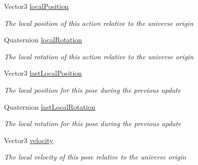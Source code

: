 \begin{DoxyCompactItemize}
Vector3 \mbox{\hyperlink{class_valve_1_1_v_r_1_1_steam_v_r___action___pose___source_adf0a89fb5f105a09f2e59151bd14e107}{local\+Position}}
\begin{DoxyCompactList}\small\item\em The local position of this action relative to the universe origin \end{DoxyCompactList}\item 
Quaternion \mbox{\hyperlink{class_valve_1_1_v_r_1_1_steam_v_r___action___pose___source_a2e2f84a6156ae78ba84497a3e4ef69ab}{local\+Rotation}}
\begin{DoxyCompactList}\small\item\em The local rotation of this action relative to the universe origin \end{DoxyCompactList}\item 
Vector3 \mbox{\hyperlink{class_valve_1_1_v_r_1_1_steam_v_r___action___pose___source_a30356d9d2fc9e4e03544406a493b36d8}{last\+Local\+Position}}
\begin{DoxyCompactList}\small\item\em The local position for this pose during the previous update \end{DoxyCompactList}\item 
Quaternion \mbox{\hyperlink{class_valve_1_1_v_r_1_1_steam_v_r___action___pose___source_a28136f6855113693d54c7ffc3f23a2e7}{last\+Local\+Rotation}}
\begin{DoxyCompactList}\small\item\em The local rotation for this pose during the previous update \end{DoxyCompactList}\item 
Vector3 \mbox{\hyperlink{class_valve_1_1_v_r_1_1_steam_v_r___action___pose___source_a52549ae6b1ddc04aa27f439314440c5a}{velocity}}
\begin{DoxyCompactList}\small\item\em The local velocity of this pose relative to the universe origin \end{DoxyCompactList}\item 

\end{DoxyCompactItemize}
